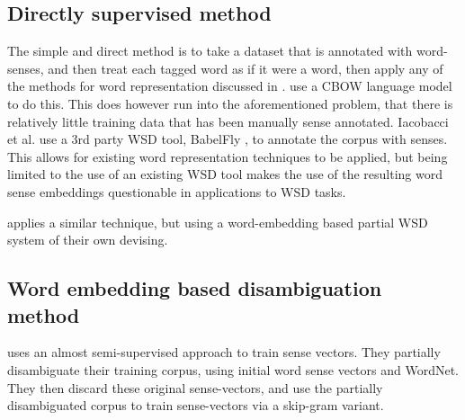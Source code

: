 \documentclass[12pt,parskip]{komatufte}
\begin{document}
\subsection{Directly supervised method}
The simple and direct method is to take a dataset that is annotated with word-senses,
and then treat each tagged word as if it were a word, then apply any of the methods for word representation discussed in .
 use a CBOW language model \parencite{mikolov2013efficient} to do this.
This does however run into the aforementioned problem, that there is relatively little training data that has been manually sense annotated.
Iacobacci et al. use a 3rd party WSD tool, BabelFly , to annotate the corpus with senses.
This allows for existing word representation techniques to be applied, but being limited to the use of an existing WSD tool makes the use of the resulting word sense embeddings questionable in applications to WSD tasks.

 applies a similar technique, but using a word-embedding based partial WSD system of their own devising.


\subsection{Word embedding based disambiguation method}\label{sec:pseudo-semi-supervised-method}

\textcite{Chen2014} uses an almost semi-supervised approach to train sense vectors.
They partially disambiguate their training corpus, using initial word sense vectors and WordNet.
They then discard these original sense-vectors, and use the partially disambiguated corpus to train sense-vectors via a skip-gram variant.


%
\end{document}
